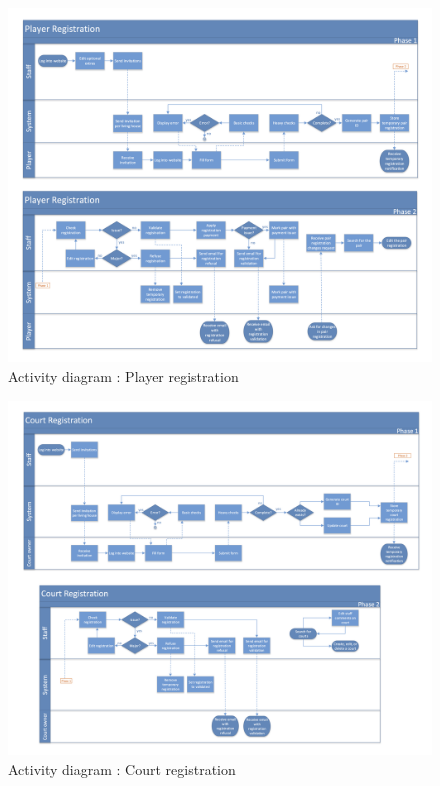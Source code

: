 \begin{figure}[!ht]
    \centering
    \includegraphics[width=0.9\linewidth]{res/Activity-diagram-PR-01-v2.png}
    \caption{Activity diagram : Player registration}
\end{figure}

\begin{figure}[!ht]
    \centering
    \includegraphics[width=0.9\linewidth]{res/Activity-diagram-CR-02-v2.png}
    \caption{Activity diagram : Court registration}
\end{figure}

